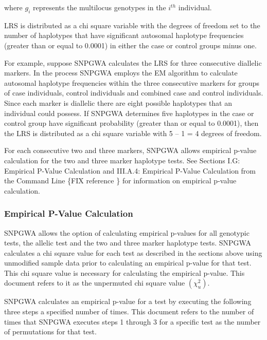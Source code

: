 \noindent{} where $g_i$ represents the multilocus genotypes in the $i^{th}$
individual.

LRS is distributed as a chi square variable with the degrees of freedom set to
the number of haplotypes that have significant autosomal haplotype frequencies
(greater than or equal to 0.0001) in either the case or control groups minus
one.

For example, suppose SNPGWA calculates the LRS for three consecutive diallelic
markers.  In the process SNPGWA employs the EM algorithm to calculate autosomal
haplotype frequencies within the three consecutive markers for groups of case
individuals, control individuals and combined case and control individuals.
Since each marker is diallelic there are eight possible haplotypes that an
individual could possess.  If SNPGWA determines five haplotypes in the case or
control group have significant probability (greater than or equal to 0.0001),
then the LRS is distributed as a chi square variable with 5 – 1 = 4 degrees of
freedom.

For each consecutive two and three markers, SNPGWA allows empirical p-value
calculation for the two and three marker haplotype tests.  See Sections I.G:
Empirical P-Value Calculation and III.A.4: Empirical P-Value Calculation from
the Command Line \{FIX reference \} for information on empirical p-value
calculation.

\subsubsection{Empirical P-Value Calculation}

SNPGWA allows the option of calculating empirical p-values for all genotypic
tests, the allelic test and the two and three marker haplotype tests.  SNPGWA
calculates a chi square value for each test as described in the sections above
using unmodified sample data prior to calculating an empirical p-value for that
test.  This chi square value is necessary for calculating the empirical p-value.
This document refers to it as the unpermuted chi square value
$\left(\chi^2_u\right)$.

SNPGWA calculates an empirical p-value for a test by executing the following
three steps a specified number of times.  This document refers to the number of
times that SNPGWA executes steps 1 through 3 for a specific test as the number
of permutations for that test.

